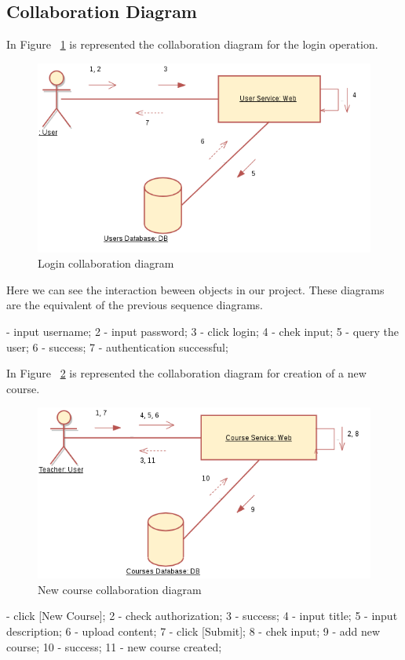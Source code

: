 \documentclass[12pt,a4paper,titlepage]{article}
\begin{document}
\subsection{Collaboration Diagram}
In Figure ~\ref{fig:4login} is represented the collaboration diagram for the login operation.
\begin{figure}[H]
\centering
	\includegraphics[width=15cm]{4login}
	\caption{Login collaboration diagram}
	\label{fig:4login}
\end{figure}
Here we can see the interaction beween objects in our project. These diagrams are the equivalent of the previous sequence diagrams.\par
{} - input username;
2 - input password;
3 - click login;
4 - chek input;
5 - query the user;
6 - success;
7 - authentication successful;

In Figure ~\ref{fig:4create} is represented the collaboration diagram for creation of a new course.
\begin{figure}[H]
\centering
	\includegraphics[width=15cm]{4create}
	\caption{New course collaboration diagram}
	\label{fig:4create}
\end{figure}
 - click [New Course];
 2 - check authorization;
 3 - success;
 4 - input title;
 5 - input description;
 6 - upload content;
 7 - click [Submit];
 8 - chek input;
 9 - add new course;
10 - success;
11 - new course created;
\end{document}
